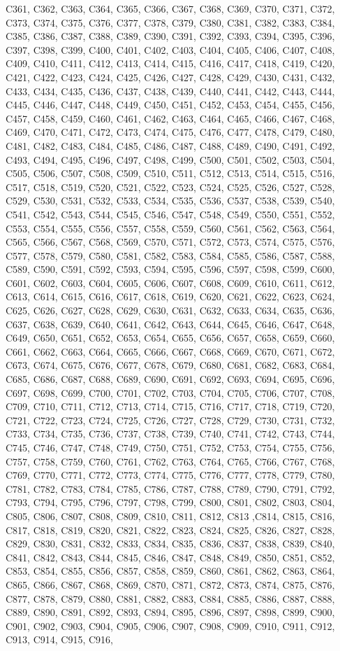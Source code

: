 C361, C362, C363, C364, C365, C366, C367, C368, C369, C370, C371, C372, C373, C374, C375, C376, C377, C378, C379, C380, C381, C382, C383, C384, C385, C386, C387, C388, C389, C390, C391, C392, C393, C394, C395, C396, C397, C398, C399, C400, C401, C402, C403, C404, C405, C406, C407, C408, C409, C410, C411, C412, C413, C414, C415, C416, C417, C418, C419, C420, C421, C422, C423, C424, C425, C426, C427, C428, C429, C430, C431, C432, C433, C434, C435, C436, C437, C438, C439, C440, C441, C442, C443, C444, C445, C446, C447, C448, C449, C450, C451, C452, C453, C454, C455, C456, C457, C458, C459, C460, C461, C462, C463, C464, C465, C466, C467, C468, C469, C470, C471, C472, C473, C474, C475, C476, C477, C478, C479, C480, C481, C482, C483, C484, C485, C486, C487, C488, C489, C490, C491, C492, C493, C494, C495, C496, C497, C498, C499, C500, C501, C502, C503, C504, C505, C506, C507, C508, C509, C510, C511, C512, C513, C514, C515, C516, C517, C518, C519, C520, C521, C522, C523, C524, C525, C526, C527, C528, C529, C530, C531, C532, C533, C534, C535, C536, C537, C538, C539, C540, C541, C542, C543, C544, C545, C546, C547, C548, C549, C550, C551, C552, C553, C554, C555, C556, C557, C558, C559, C560, C561, C562, C563, C564, C565, C566, C567, C568, C569, C570, C571, C572, C573, C574, C575, C576, C577, C578, C579, C580, C581, C582, C583, C584, C585, C586, C587, C588, C589, C590, C591, C592, C593, C594, C595, C596, C597, C598, C599, C600, C601, C602, C603, C604, C605, C606, C607, C608, C609, C610, C611, C612, C613, C614, C615, C616, C617, C618, C619, C620, C621, C622, C623, C624, C625, C626, C627, C628, C629, C630, C631, C632, C633, C634, C635, C636, C637, C638, C639, C640, C641, C642, C643, C644, C645, C646, C647, C648, C649, C650, C651, C652, C653, C654, C655, C656, C657, C658, C659, C660, C661, C662, C663, C664, C665, C666, C667, C668, C669, C670, C671, C672, C673, C674, C675, C676, C677, C678, C679, C680, C681, C682, C683, C684, C685, C686, C687, C688, C689, C690, C691, C692, C693, C694, C695, C696, C697, C698, C699, C700, C701, C702, C703, C704, C705, C706, C707, C708, C709, C710, C711, C712, C713, C714, C715, C716, C717, C718, C719, C720, C721, C722, C723, C724, C725, C726, C727, C728, C729, C730, C731, C732, C733, C734, C735, C736, C737, C738, C739, C740, C741, C742, C743, C744, C745, C746, C747, C748, C749, C750, C751, C752, C753, C754, C755, C756, C757, C758, C759, C760, C761, C762, C763, C764, C765, C766, C767, C768, C769, C770, C771, C772, C773, C774, C775, C776, C777, C778, C779, C780, C781, C782, C783, C784, C785, C786, C787, C788, C789, C790, C791, C792, C793, C794, C795, C796, C797, C798, C799, C800, C801, C802, C803, C804, C805, C806, C807, C808, C809, C810, C811, C812, C813 ,C814, C815, C816, C817, C818, C819, C820, C821, C822, C823, C824, C825, C826, C827, C828, C829, C830, C831, C832, C833, C834, C835, C836, C837, C838, C839, C840, C841, C842, C843, C844, C845, C846, C847, C848, C849, C850, C851, C852, C853, C854, C855, C856, C857, C858, C859, C860, C861, C862, C863, C864, C865, C866, C867, C868, C869, C870, C871, C872, C873, C874, C875, C876, C877, C878, C879, C880, C881, C882, C883, C884, C885, C886, C887, C888, C889, C890, C891, C892, C893, C894, C895, C896, C897, C898, C899, C900, C901, C902, C903, C904, C905, C906, C907, C908, C909, C910, C911, C912, C913, C914, C915, C916, 